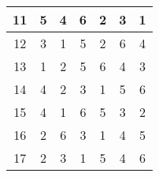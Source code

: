 \begin{table}[]
\begin{tabular}{|c|c|c|c|c|c|c|}
    11                                                       & 5                                                 & 4                                                 & 6                                                 & 2                                                 & 3                                                 & 1                                                 \\ \hline
    12                                                       & 3                                                 & 1                                                 & 5                                                 & 2                                                 & 6                                                 & 4                                                 \\ \hline
    13                                                       & 1                                                 & 2                                                 & 5                                                 & 6                                                 & 4                                                 & 3                                                 \\ \hline
    14                                                       & 4                                                 & 2                                                 & 3                                                 & 1                                                 & 5                                                 & 6                                                 \\ \hline
    15                                                       & 4                                                 & 1                                                 & 6                                                 & 5                                                 & 3                                                 & 2                                                 \\ \hline
    16                                                       & 2                                                 & 6                                                 & 3                                                 & 1                                                 & 4                                                 & 5                                                 \\ \hline
    17                                                       & 2                                                 & 3                                                 & 1                                                 & 5                                                 & 4                                                 & 6                                                 \\ \hline

\end{tabular}
\end{table}
